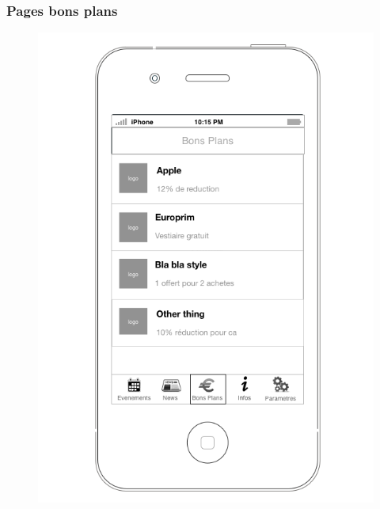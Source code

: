 \documentclass[a4paper, 11px]{article}
\begin{document}
\subsubsection{Pages bons plans}
\begin{figure}[htbp]
	\begin{minipage}[c]{.50\linewidth}
		\begin{center}
			\includegraphics[scale=0.3]{../../Sketch/iOS/bons_plans_liste.png}
		\end{center}
	\end{minipage}
	\hfill
	\begin{minipage}[c]{.50\linewidth}
		\begin{center}

\end{center}
\end{minipage}
\end{figure}
\end{document}
